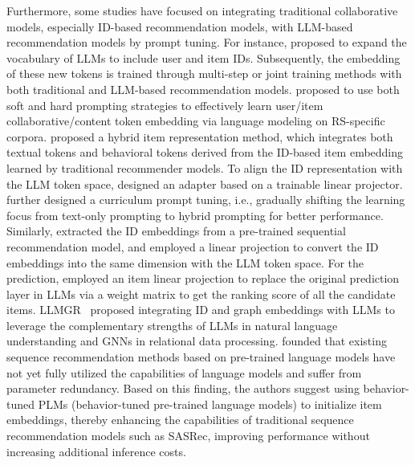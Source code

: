 \documentclass[sn-mathphys-num]{sn-jnl}%
\theoremstyle{thmstyleone}%
\theoremstyle{thmstyletwo}%
\theoremstyle{thmstylethree}%
\begin{document}
Furthermore, some studies have focused on integrating traditional collaborative models,  especially ID-based recommendation models, with LLM-based recommendation models by prompt tuning. For instance, \cite{zhang2023collm,zhang2023bridging} proposed to expand the vocabulary of LLMs to include user and item IDs. Subsequently, the embedding of these new tokens is trained through multi-step or joint training methods with both traditional and LLM-based recommendation models.
\cite{zhu2023collaborative} proposed to use both soft and hard prompting strategies to effectively learn user/item collaborative/content token embedding via language modeling on RS-specific corpora.
\cite{liao2023llara} proposed a hybrid item representation method, which integrates both textual tokens and behavioral tokens derived from the ID-based item embedding learned by traditional recommender models. To align the ID representation with the LLM token space, \cite{liao2023llara} designed an adapter based on a trainable linear projector. \cite{liao2023llara} further designed a curriculum prompt tuning, i.e., gradually shifting the learning focus from text-only prompting to hybrid prompting for better performance. Similarly, \cite{li2023e4srec} extracted the ID embeddings from a pre-trained sequential recommendation model, and employed a linear projection to convert the ID embeddings into the same dimension with the LLM token space. For the prediction, \cite{li2023e4srec} employed an item linear projection to replace the original prediction layer in LLMs via a weight matrix to get the ranking score of all the candidate items.
LLMGR~\cite{DBLP:journals/corr/abs-2402-16539} proposed integrating ID and graph embeddings with LLMs to leverage the complementary strengths of LLMs in natural language understanding and GNNs in relational data processing. \cite{qu2024elephant} founded that existing sequence recommendation methods based on pre-trained language models have not yet fully utilized the capabilities of language models and suffer from parameter redundancy. Based on this finding, the authors suggest using behavior-tuned PLMs (behavior-tuned pre-trained language models) to initialize item embeddings, thereby enhancing the capabilities of traditional sequence recommendation models such as SASRec, improving performance without increasing additional inference costs.
\end{document}
